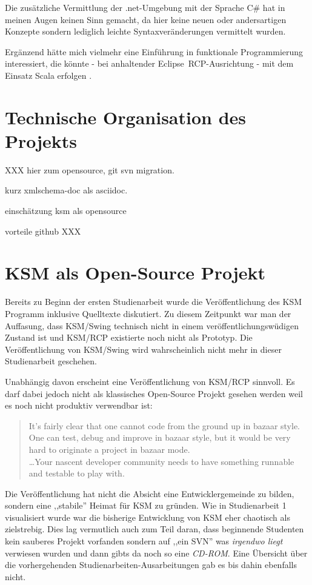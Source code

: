\documentclass[%
12pt,titlepage,abstracton]{scrreprt}
\begin{document}
Die zusätzliche Vermittlung der .net-Umgebung mit der Sprache C\# hat in meinen
Augen keinen Sinn gemacht, da hier keine neuen oder andersartigen Konzepte
sondern lediglich leichte Syntaxveränderungen vermittelt wurden.

Ergänzend hätte mich vielmehr eine Einführung in funktionale Programmierung
interessiert, die könnte - bei anhaltender Eclipse~RCP-Ausrichtung - mit dem
Einsatz Scala erfolgen \cite{eclipse:scalabundle}\cite{eclipse:scalarcp}.

\section{Technische Organisation des Projekts}
XXX
hier zum opensource, git svn migration.

kurz xmlschema-doc als asciidoc.

einschätzung ksm als opensource

vorteile github
XXX

\section{KSM als Open-Source Projekt}
Bereits zu Beginn der ersten Studienarbeit wurde die Veröffentlichung des KSM
Programm inklusive Quelltexte diskutiert. Zu diesem Zeitpunkt war man der
Auffasung, dass KSM/Swing technisch nicht in einem veröffentlichungswüdigen
Zustand ist und KSM/RCP existierte noch nicht als Prototyp.
Die Veröffentlichung von KSM/Swing wird wahrscheinlich nicht mehr in dieser
Studienarbeit geschehen.

Unabhängig davon erscheint eine Veröffentlichung von KSM/RCP sinnvoll. Es darf
dabei jedoch nicht als klassisches Open-Source Projekt gesehen werden weil es
noch nicht produktiv verwendbar ist:
\begin{quote}
It's fairly clear that one cannot code from the ground up in bazaar style.
One can test, debug and improve in bazaar style, but it would be very hard to
originate a project in bazaar mode.\\
\ldots Your nascent developer community needs to have something runnable and
testable to play with.
\end{quote}

Die Veröffentlichung hat nicht die Absicht eine Entwicklergemeinde zu bilden,
sondern eine ,,stabile'' Heimat für KSM zu gründen. Wie in Studienarbeit 1
visualisiert wurde \cite[S. 2]{fischer10} war die bisherige Entwicklung von KSM
eher chaotisch als zielstrebig. Dies lag vermutlich auch zum Teil daran, dass
beginnende Studenten kein sauberes Projekt vorfanden sondern auf ,,ein SVN'' was
\textit{irgendwo liegt} verwiesen wurden und dann gibts da noch so eine
\textit{CD-ROM}. Eine Übersicht über die vorhergehenden
Studienarbeiten-Ausarbeitungen gab es bis dahin ebenfalls nicht.
\end{document}
